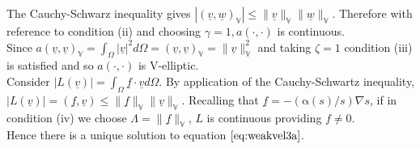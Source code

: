 \documentclass[11pt]{article}
\newcommand{\ul}{\underline}
\newcommand{\bigv}{\mathbb{V}}
\newcommand{\Om}{\Omega}
\newcommand{\al}{\mathrm{\alpha}}
\begin{document}
The Cauchy-Schwarz inequality gives 
$|(\ul{v},\ul{w})_{\bigv}| \leq \|  \ul{v}   \|_{\bigv}\|  \ul{w}   \|_{\bigv}    .$
Therefore with reference to condition (ii) and choosing $\gamma = 1, a(\cdot,\cdot)$ is continuous.\\   
Since $a(\ul{v},\ul{v})_{\bigv}= \int_{\Om}|\ul{v}|^2d\Om = (\ul{v},\ul{v})_{\bigv} =     \|  \ul{v}   \|_{\bigv}^2      $ and taking $\zeta = 1$ condition (iii) is satisfied and so $a(\cdot,\cdot)$ is V-elliptic.\\
Consider $|L(\ul{v})| =   \int_{\Om}\ul{f}\cdot\ul{v}d\Om$. By application of the Cauchy-Schwartz inequality, $|L(\ul{v})| = (\ul{f},\ul{v}) \leq \|\ul{f}\|_{\bigv}\|\ul{v}\|_{\bigv}.$  Recalling that $\ul{f} = -(\al(s)/s)\nabla{s}$, if in condition (iv) we choose $\Lambda = \|\ul{f}\|_{\bigv}$, $L$ is continuous providing $f\ne0$.\\
Hence there is a unique solution to equation $\ref{eq:weakvel3a}$.
\end{document}
